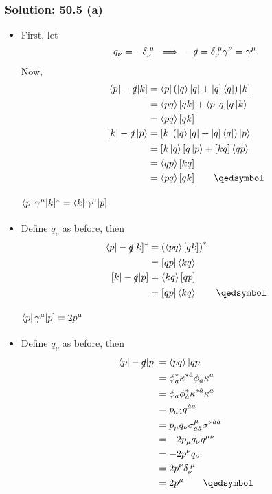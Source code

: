 \documentclass{beamer}
\begin{document}
\begin{frame}
\frametitle{Solution: 50.5 (a)}
\begin{itemize}
    \framesubtitle<1>{$\bra{p}\gamma^\mu|k] = [k|\gamma^\mu\ket{p}$}
    \item<only@1> First, let 
    \[ q_\nu = -\delta_\nu^{\;\mu} \; \implies \; -\slashed{q} = \delta_\nu^{\;\mu}\gamma^\nu = \gamma^\mu. \]
    Now,
    \begin{align*}
        \bra{p}-\slashed{q}|k] &= \bra{p}\left(\ket{q}[q| + |q]\bra{q}\right)|k] \\
        &= \ev{pq}[qk] + \bra{p}q][q\ket{k} \\
        &= \ev{pq}[qk] \\
        [k|-\slashed{q}\ket{p} &= [k|\left(\ket{q}[q| + |q]\bra{q}\right)\ket{p} \\
        &= [k\ket{q}[q\ket{p} + [kq]\ev{qp} \\
        &= \ev{qp}[kq] \\
        &= \ev{pq}[qk] \qquad\qedsymbol
    \end{align*}

    \framesubtitle<2>{$\bra{p}\gamma^\mu|k]^* = \bra{k}\gamma^\mu|p]$}
    \item<only@2> Define $q_\nu$ as before, then
    \begin{align*}
        \bra{p}-\slashed{q}|k]^* &= \left(\ev{pq}[qk]\right)^* \\
        &= [qp]\ev{kq} \\
        [k|-\slashed{q}|p] &= \ev{kq}[qp] \\
        &= [qp]\ev{kq} \qquad\qedsymbol
    \end{align*} 

    \framesubtitle<3>{$\bra{p}\gamma^\mu|p] = 2p^\mu$}
    \item<only@3> Define $q_\nu$ as before, then
    \begin{align*}
        \bra{p}-\slashed{q}|p] &= \ev{pq}[qp] \\
        &= \phi_{\dot{a}}^*\kappa^{*\dot{a}}\phi_a\kappa^a \\
        &= \phi_a\phi_{\dot{a}}^*\kappa^{*\dot{a}}\kappa^a \\
        &= p_{a\dot{a}}q^{\dot{a}a} \\
        &= p_\mu q_\nu \sigma_{a\dot{a}}^\mu\bar{\sigma}^{\nu\dot{a}a} \\
        &= -2p_\mu q_\nu g^{\mu\nu} \\
        &= -2p^\nu q_\nu \\
        &= 2p^\nu \delta_\nu^{\;\mu} \\
        &= 2p^\mu \qquad\qedsymbol
    \end{align*}


\end{itemize}
\end{frame}
\end{document}
